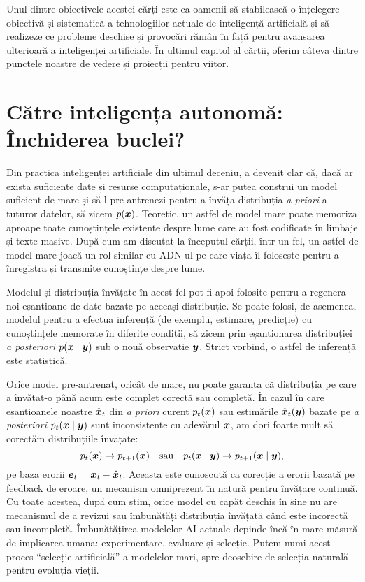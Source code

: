 \documentclass[../../book-main_ro.tex]{subfiles}
\begin{document}
Unul dintre obiectivele acestei cărți este ca oamenii să stabilească o înțelegere obiectivă și sistematică a tehnologiilor actuale de inteligență artificială și să realizeze ce probleme deschise și provocări rămân în față pentru avansarea ulterioară a inteligenței artificiale. În ultimul capitol al cărții, oferim câteva dintre punctele noastre de vedere și proiecții pentru viitor.

\section{Către inteligența autonomă: Închiderea buclei?}
Din practica inteligenței artificiale din ultimul deceniu, a devenit clar că, dacă ar exista suficiente date și resurse computaționale, s-ar putea construi un model suficient de mare și să-l pre-antrenezi pentru a învăța distribuția {\em a priori} a tuturor datelor, să zicem $p(\bm{x})$. Teoretic, un astfel de model mare poate memoriza aproape toate cunoștințele existente despre lume care au fost codificate în limbaje și texte masive. După cum am discutat la începutul cărții, într-un fel, un astfel de model mare joacă un rol similar cu ADN-ul pe care viața îl folosește pentru a înregistra și transmite cunoștințe despre lume.

Modelul și distribuția învățate în acest fel pot fi apoi folosite pentru a regenera noi eșantioane de date bazate pe aceeași distribuție. Se poate folosi, de asemenea, modelul pentru a efectua inferență (de exemplu, estimare, predicție) cu cunoștințele memorate în diferite condiții, să zicem prin eșantionarea distribuției {\em a posteriori} $p(\bm{x}\mid \bm{y})$ sub o nouă observație $\bm{y}$. Strict vorbind, o astfel de inferență este statistică.

Orice model pre-antrenat, oricât de mare, nu poate garanta că distribuția pe care a învățat-o până acum este complet corectă sau completă. În cazul în care eșantioanele noastre $\hat{\bm{x}}_t$ din {\em a priori} curent $p_t(\bm{x})$ sau estimările $\hat{\bm{x}}_t(\bm{y})$ bazate pe {\em a posteriori} $p_t(\bm{x}\mid \bm{y})$ sunt inconsistente cu adevărul $\bm{x}$, am dori foarte mult să corectăm distribuțiile învățate:
\begin{equation}
    p_t(\bm{x}) \rightarrow p_{t+1}(\bm{x}) \quad \mbox{sau}\quad p_t(\bm{x}\mid \bm{y}) \rightarrow p_{t+1}(\bm{x}\mid \bm{y}),
\end{equation}
pe baza erorii $\boldsymbol{e}_t = \bm{x}_t - \hat{\bm{x}}_t$. Aceasta este cunoscută ca corecție a erorii bazată pe feedback de eroare, un mecanism omniprezent în natură pentru învățare continuă. Cu toate acestea, după cum știm, orice model cu capăt deschis în sine nu are mecanismul de a revizui sau îmbunătăți distribuția învățată când este incorectă sau incompletă. Îmbunătățirea modelelor AI actuale depinde încă în mare măsură de implicarea umană: experimentare, evaluare și selecție. Putem numi acest proces ``selecție artificială'' a modelelor mari, spre deosebire de selecția naturală pentru evoluția vieții.
\end{document}
